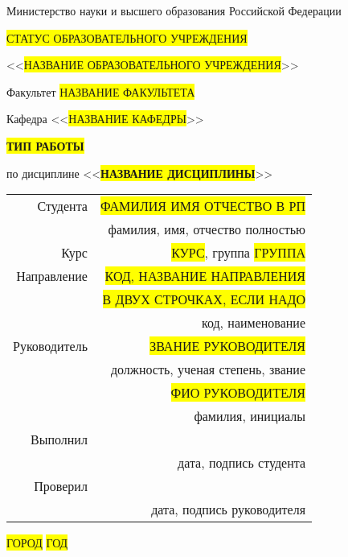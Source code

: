 \thispagestyle{empty}

\begin{center}
    Министерство науки и высшего образования Российской Федерации

    \colorbox{yellow}{СТАТУС ОБРАЗОВАТЕЛЬНОГО УЧРЕЖДЕНИЯ}

    <<\colorbox{yellow}{НАЗВАНИЕ ОБРАЗОВАТЕЛЬНОГО УЧРЕЖДЕНИЯ}>>

    \vspace{1cm}
    Факультет \colorbox{yellow}{НАЗВАНИЕ ФАКУЛЬТЕТА}

    Кафедра <<\colorbox{yellow}{НАЗВАНИЕ КАФЕДРЫ}>>

    \vspace{4cm}
    \textbf{\colorbox{yellow}{ТИП РАБОТЫ}}

    по дисциплине <<\textbf{\colorbox{yellow}{НАЗВАНИЕ ДИСЦИПЛИНЫ}}>>
\end{center}

\vspace{2cm}
\begin{flushright}    
    \begin{tabular}{ r r }
        Студента & \colorbox{yellow}{ФАМИЛИЯ ИМЯ ОТЧЕСТВО В РП} \\
        \cline{2-2}
        & \tiny{фамилия, имя, отчество полностью} \\

        Курс & \colorbox{yellow}{КУРС}, группа \colorbox{yellow}{ГРУППА} \\
        \cline{2-2}
        Направление & \colorbox{yellow}{КОД, НАЗВАНИЕ НАПРАВЛЕНИЯ} \\
        \cline{2-2}
        & \colorbox{yellow}{В ДВУХ СТРОЧКАХ, ЕСЛИ НАДО} \\
        \cline{2-2}
        & \tiny{код, наименование} \\

        Руководитель & \colorbox{yellow}{ЗВАНИЕ РУКОВОДИТЕЛЯ} \\
        \cline{2-2}
        & \tiny{должность, ученая степень, звание} \\
        & \colorbox{yellow}{ФИО РУКОВОДИТЕЛЯ} \\
        \cline{2-2}
        & \tiny{фамилия, инициалы} \\

        Выполнил & \\
        \cline{2-2}
        & \tiny{дата, подпись студента} \\

        Проверил & \\
        \cline{2-2}
        & \tiny{дата, подпись руководителя} \\

    \end{tabular}
\end{flushright}

\vspace*{\fill}
\begin{center}
    \colorbox{yellow}{ГОРОД} \colorbox{yellow}{ГОД}
\end{center}
